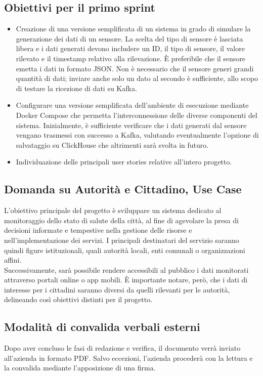 \documentclass{article}
\begin{document}
    \subsection{Obiettivi per il primo sprint}
        \begin{itemize}
            \item Creazione di una versione semplificata di un sistema in grado di simulare la generazione dei dati di un sensore. La scelta del tipo di sensore è lasciata libera e i dati generati devono includere un ID, il tipo di sensore, il valore rilevato e il timestamp relativo alla rilevazione. È preferibile che il sensore emetta i dati in formato JSON. Non è necessario che il sensore generi grandi quantità di dati; inviare anche solo un dato al secondo è sufficiente, allo scopo di testare la ricezione di dati su Kafka.
            \item Configurare una versione semplificata dell'ambiente di esecuzione mediante Docker Compose che permetta l'interconnessione delle diverse componenti del sistema. Inizialmente, è sufficiente verificare che i dati generati dal sensore vengano trasmessi con successo a Kafka, valutando eventualmente l'opzione di salvataggio su ClickHouse che altrimenti sarà svolta in futuro.
            \item Individuazione delle principali user stories relative all’intero progetto.
        \end{itemize}

    \subsection{Domanda su Autorità e Cittadino, Use Case}
        L'obiettivo principale del progetto è sviluppare un sistema dedicato al monitoraggio dello stato di salute della città, al fine di agevolare la presa di decisioni informate e tempestive nella gestione delle risorse e nell'implementazione dei servizi. I principali destinatari del servizio saranno quindi figure istituzionali, quali autorità locali, enti comunali o organizzazioni affini.\\
        Successivamente, sarà possibile rendere accessibili al pubblico i dati monitorati attraverso portali online o app mobili. È importante notare, però, che i dati di interesse per i cittadini saranno diversi da quelli rilevanti per le autorità, delineando così obiettivi distinti per il progetto.
    

    \subsection{Modalità di convalida verbali esterni}
        Dopo aver concluso le fasi di redazione e verifica, il documento verrà inviato all'azienda in formato PDF. Salvo eccezioni, l'azienda procederà con la lettura e la convalida mediante l'apposizione di una firma.
\end{document}
